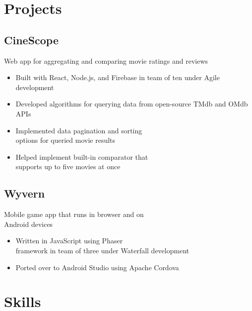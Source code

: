 \documentclass{article}
\begin{document}
\setlength{\columnsep}{1.5cm} 		%
\setlength{\columnseprule}{0.2pt} 	%
\begin{paracol}{2} 			%

\vspace{-2em}
\section{Projects}

\vspace{-0.5em}
\subsection{CineScope} \hfill

{\color{NavyBlue} Web app for aggregating and comparing movie \indent ratings and reviews}
\begin{itemize}
	\item Built with React, Node.js, and Firebase in team of ten under Agile development
	\item Developed algorithms for querying data from open-source TMdb and OMdb APIs
	\item Implemented data pagination and sorting\\options for queried movie results
	\item Helped implement built-in comparator that\\supports up to five movies at once
\end{itemize}

\subsection{Wyvern} \hfill

{\color{NavyBlue} Mobile game app that runs in browser and on \\\indent Android devices}
\begin{itemize}
	\item Written in JavaScript using Phaser\\framework in team of three under Waterfall development
	\item Ported over to Android Studio using Apache Cordova
\end{itemize}

\switchcolumn
\vspace{-2em}
\section{Skills}


\end{paracol}
\end{document}
